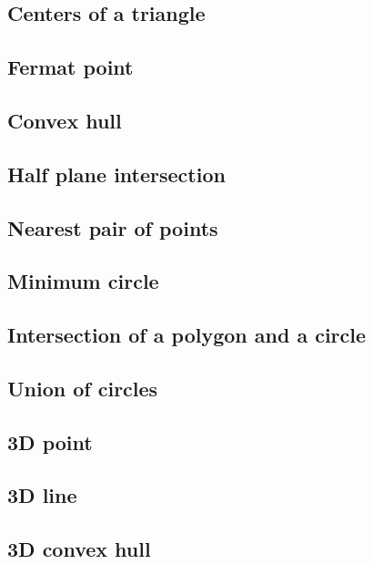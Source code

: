 \documentclass[titlepage, a4paper,10pt]{article}
\begin{document}
\begin{multicols}{2}
\begin{spacing}{0.6}
{			\subsection{Centers of a triangle}
				
			\subsection{Fermat point}
				
			\subsection{Convex hull}
				
			\subsection{Half plane intersection}
				
			\subsection{Nearest pair of points}
				
			\subsection{Minimum circle}
				
			\subsection{Intersection of a polygon and a circle}
				
			\subsection{Union of circles}
				
			\subsection{3D point}
				
			\subsection{3D line}
				
			\subsection{3D convex hull}
				
}
\end{spacing}
\end{multicols}
\end{document}
